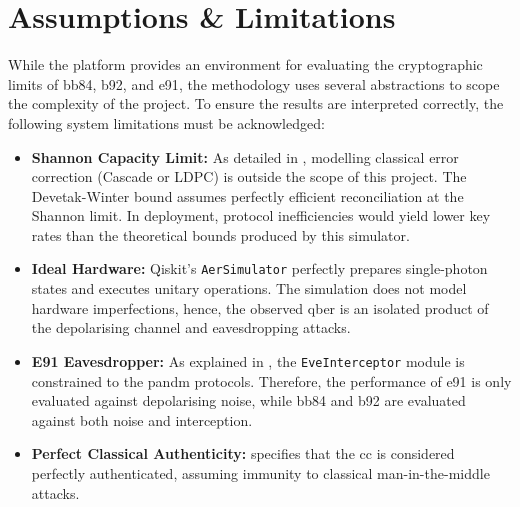 \newpage
\section{Assumptions \& Limitations}
\label{sec:assumptionslimitations}
While the platform provides an environment for evaluating the cryptographic limits of \gls{bb84}, \gls{b92}, and \gls{e91}, the methodology uses several abstractions to scope the complexity of the project. To ensure the results are interpreted correctly, the following system limitations must be acknowledged:

\begin{itemize}
    \item \textbf{Shannon Capacity Limit:} As detailed in , modelling classical error correction (Cascade or LDPC) is outside the scope of this project. The Devetak-Winter bound assumes perfectly efficient \gls{reconciliation} at the Shannon limit. In deployment, protocol inefficiencies would yield lower key rates than the theoretical bounds produced by this simulator.
    \item \textbf{Ideal Hardware:} Qiskit's \texttt{AerSimulator} perfectly prepares single-photon states and executes unitary operations. The simulation does not model hardware imperfections, hence, the observed \gls{qber} is an isolated product of the depolarising channel and eavesdropping attacks.
    \item \textbf{E91 Eavesdropper:} As explained in , the \texttt{EveInterceptor} module is constrained to the \gls{pandm} protocols. Therefore, the performance of \gls{e91} is only evaluated against depolarising noise, while \gls{bb84} and \gls{b92} are evaluated against both noise and interception.
    \item \textbf{Perfect Classical Authenticity:}  specifies that the \gls{cc} is considered perfectly authenticated, assuming immunity to classical man-in-the-middle attacks.
\end{itemize}


